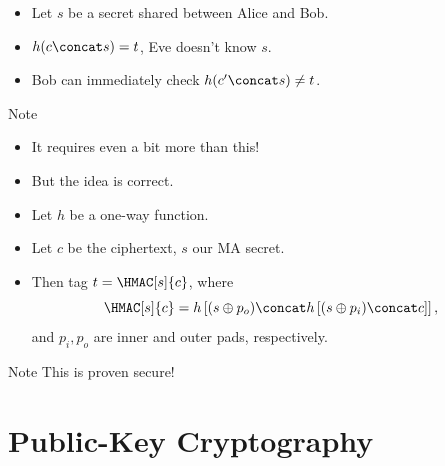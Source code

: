\begin{frame}
  \begin{solution}
    \begin{itemize}
      \item Let \(s\) be a secret shared between Alice and Bob.

        \pause{}

      \item \(h(c\concat s) = t\), Eve doesn't know \(s\).
      \item Bob can immediately check \(h(c^\prime\concat s)\neq t\).
    \end{itemize}
  \end{solution}

  \pause{}

  \begin{alertblock}{Note}
    \begin{itemize}
      \item It requires even a bit more than this!
      \item But the idea is correct.
    \end{itemize}
  \end{alertblock}
\end{frame}

\begin{frame}
  \begin{solution}
    \begin{itemize}
      \item Let \(h\) be a one-way function.
      \item Let \(c\) be the ciphertext, \(s\) our \ac{MA} secret.

        \pause{}

      \item Then tag \(t = \HMAC[s]{c}\), where \[
          \HMAC[s]{c} = h\left[
            (s\oplus p_o)\concat h\left[ (s\oplus p_i)\concat c \right]
          \right],
        \] and \(p_i, p_o\) are inner and outer pads, respectively.
    \end{itemize}
  \end{solution}

  \pause{}

  \begin{alertblock}{Note}
    This is proven secure!
  \end{alertblock}
\end{frame}


\section{Public-Key Cryptography}

